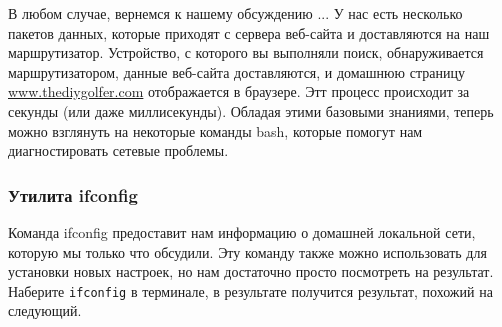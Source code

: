 \documentclass{article}
\begin{document}
В любом случае, вернемся к нашему обсуждению ... У нас есть несколько
пакетов данных, которые приходят с сервера веб-сайта и доставляются на
наш маршрутизатор. Устройство, с которого вы выполняли поиск,
обнаруживается маршрутизатором, данные веб-сайта доставляются, и
домашнюю страницу
\href{http://www.thediygolfer.com}{www.thediygolfer.com} отображается в
браузере. Этт процесс происходит за секунды (или даже миллисекунды).
Обладая этими базовыми знаниями, теперь можно взглянуть на некоторые
команды bash, которые помогут нам диагностировать сетевые проблемы.

\hypertarget{ifconfig}{%
\subsubsection{\texorpdfstring{\protect\hyperlink{ifconfig}{}Утилита
ifconfig}{Утилита ifconfig}}\label{ifconfig}}

Команда ifconfig предоставит нам информацию о домашней локальной сети,
которую мы только что обсудили. Эту команду также можно использовать для
установки новых настроек, но нам достаточно просто посмотреть на
результат. Наберите \texttt{ifconfig} в терминале, в результате
получится результат, похожий на следующий.
\end{document}
